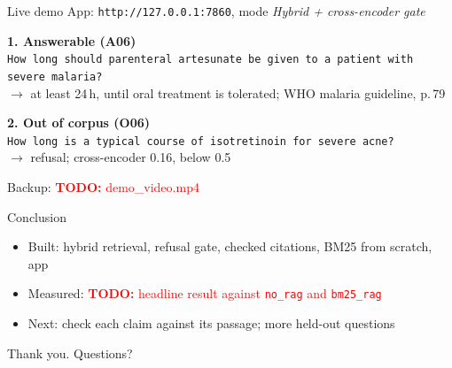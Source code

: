 \documentclass[12pt,aspectratio=169]{beamer}
\newcommand{\TODO}[1]{\textcolor{red}{\textbf{TODO:} #1}}
\begin{document}
\begin{frame}{Live demo}
  \small
  App: \texttt{http://127.0.0.1:7860}, mode \emph{Hybrid + cross-encoder gate}
  \medskip

  \textbf{1. Answerable (A06)}\\
  \texttt{How long should parenteral artesunate be given to a patient with severe malaria?}\\
  $\to$ at least 24\,h, until oral treatment is tolerated; WHO malaria guideline, p.\,79
  \medskip

  \textbf{2. Out of corpus (O06)}\\
  \texttt{How long is a typical course of isotretinoin for severe acne?}\\
  $\to$ refusal; cross-encoder 0.16, below 0.5
  \medskip

  Backup: \TODO{demo\_video.mp4}
\end{frame}

\begin{frame}{Conclusion}
  \begin{itemize}
    \item Built: hybrid retrieval, refusal gate, checked citations, BM25 from scratch, app
    \item Measured: \TODO{headline result against \texttt{no\_rag} and \texttt{bm25\_rag}}
    \item Next: check each claim against its passage; more held-out questions
  \end{itemize}
  \vfill
  \centering\Large Thank you. Questions?
\end{frame}
\end{document}

